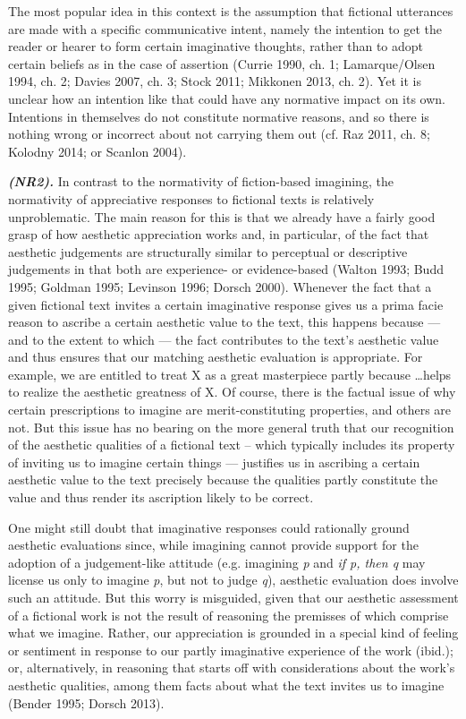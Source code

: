 The most popular idea in this context is the assumption that fictional utterances are made with a specific communicative intent, namely the intention to get the reader or hearer to form certain imaginative thoughts, rather than to adopt certain beliefs as in the case of assertion (Currie 1990, ch. 1; Lamarque/Olsen 1994, ch. 2; Davies 2007, ch. 3; Stock 2011; Mikkonen 2013, ch. 2). Yet it is unclear how an intention like that could have any normative impact on its own. Intentions in themselves do not constitute normative reasons, and so there is nothing wrong or incorrect about not carrying them out (cf. Raz 2011, ch. 8; Kolodny 2014; or Scanlon 2004).

\vspace{.2cm}
\noindent\textbf{\emph{(NR2).}} In contrast to the normativity of fiction-based imagining, the normativity of appreciative responses to fictional texts is relatively unproblematic. The main reason for this is that we already have a fairly good grasp of how aesthetic appreciation works and, in particular, of the fact that aesthetic judgements are structurally similar to perceptual or descriptive judgements in that both are experience- or evidence-based (Walton 1993; Budd 1995; Goldman 1995; Levinson 1996; Dorsch 2000). Whenever the fact that a given fictional text invites a certain imaginative response gives us a prima facie reason to ascribe a certain aesthetic value to the text, this happens because --- and to the extent to which --- the fact contributes to the text's aesthetic value and thus ensures that our matching aesthetic evaluation is appropriate. For example, we are entitled to treat X as a great masterpiece partly because \ldots helps to realize the aesthetic greatness of X. Of course, there is the factual issue of why certain prescriptions to imagine are merit-constituting properties, and others are not. But this issue has no bearing on the more general truth that our recognition of the aesthetic qualities of a fictional text -- which typically includes its property of inviting us to imagine certain things --- justifies us in ascribing a certain aesthetic value to the text precisely because the qualities partly constitute the value and thus render its ascription likely to be correct.

One might still doubt that imaginative responses could rationally ground aesthetic evaluations since, while imagining cannot provide support for the adoption of a judgement-like attitude (e.g. imagining \emph{p} and \emph{if p, then q} may license us only to imagine \emph{p}, but not to judge \emph{q}), aesthetic evaluation does involve such an attitude. But this worry is misguided, given that our aesthetic assessment of a fictional work is not the result of reasoning the premisses of which comprise what we imagine. Rather, our appreciation is grounded in a special kind of feeling or sentiment in response to our partly imaginative experience of the work (ibid.); or, alternatively, in reasoning that starts off with considerations about the work's aesthetic qualities, among them facts about what the text invites us to imagine (Bender 1995; Dorsch 2013).

